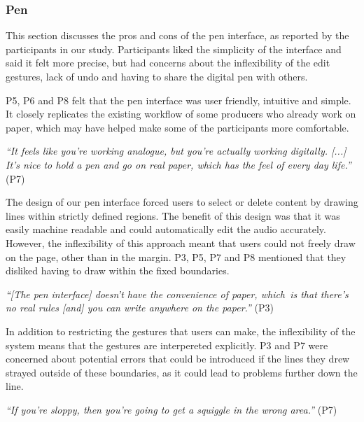 \subsubsection{Pen}

This section discusses the pros and cons of the pen interface, as reported by the participants in our study.
Participants liked the simplicity of the interface and said it felt more precise, but had concerns about the
inflexibility of the edit gestures, lack of undo and having to share the digital pen with others.


P5, P6 and P8 felt that the pen interface was user friendly, intuitive and simple. It closely replicates the existing
workflow of some producers who already work on paper, which may have helped make some of the participants more
comfortable.

\textit{``It feels like you're working analogue, but you're actually working digitally. [...] It's nice to hold a pen
and go on real paper, which has the feel of every day life.''} (P7)


The design of our pen interface forced users to select or delete content by drawing lines within strictly defined
regions. The benefit of this design was that it was easily machine readable and could automatically edit the audio
accurately. However, the inflexibility of this approach meant that users could not freely draw on the page, other than
in the margin. P3, P5, P7 and P8 mentioned that they disliked having to draw within the fixed boundaries.

\textit{``[The pen interface] doesn't have the convenience of paper, which is that there's no real rules [and] you can
write anywhere on the paper.''} (P3)

In addition to restricting the gestures that users can make, the inflexibility of the system means that the gestures
are interpereted explicitly. P3 and P7 were concerned about potential errors that could be introduced if the lines they
drew strayed outside of these boundaries, as it could lead to problems further down the line.

\textit{``If you're sloppy, then you're going to get a squiggle in the wrong area.''} (P7)


